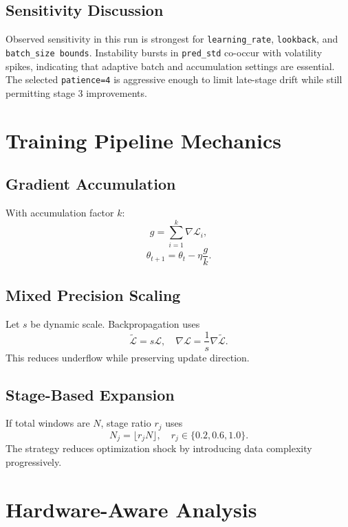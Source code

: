 \documentclass{article}
\begin{document}
\subsection{Sensitivity Discussion}
Observed sensitivity in this run is strongest for \texttt{learning\_rate}, \texttt{lookback}, and \texttt{batch\_size bounds}. Instability bursts in \texttt{pred\_std} co-occur with volatility spikes, indicating that adaptive batch and accumulation settings are essential. The selected \texttt{patience=4} is aggressive enough to limit late-stage drift while still permitting stage 3 improvements.

\section{Training Pipeline Mechanics}
\subsection{Gradient Accumulation}
With accumulation factor $k$:
\begin{equation}
g = \sum_{i=1}^{k} \nabla \mathcal{L}_i,
\end{equation}
\begin{equation}
\theta_{t+1} = \theta_t - \eta \frac{g}{k}.
\end{equation}

\subsection{Mixed Precision Scaling}
Let $s$ be dynamic scale. Backpropagation uses
\begin{equation}
\tilde{\mathcal{L}} = s \mathcal{L}, \quad
\nabla\mathcal{L}=\frac{1}{s}\nabla\tilde{\mathcal{L}}.
\end{equation}
This reduces underflow while preserving update direction.

\subsection{Stage-Based Expansion}
If total windows are $N$, stage ratio $r_j$ uses
\begin{equation}
N_j = \lfloor r_j N \rfloor, \quad r_j \in \{0.2,0.6,1.0\}.
\end{equation}
The strategy reduces optimization shock by introducing data complexity progressively.

\section{Hardware-Aware Analysis}
\end{document}
